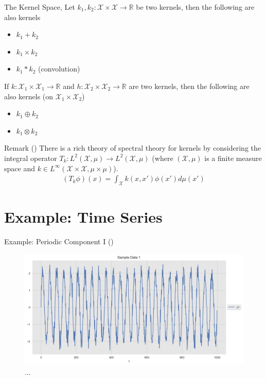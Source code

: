 \documentclass[10pt]{beamer}
\begin{document}
\begin{frame}{The Kernel Space}{\cite{ROERGA}, \cite[Chapter 4]{RW05}}
Let $k_1, k_2: \mathcal{X}\times\mathcal{X}\longrightarrow \mathbb{R}$ be two kernels, then the following are also kernels 
\begin{itemize}
\item $k_1 + k_2$ 
\item $k_1 \times k_2$
\item $k_1*k_2$ (convolution)
\end{itemize}
If $k: \mathcal{X}_1\times\mathcal{X}_1\longrightarrow \mathbb{R}$ and $h: \mathcal{X}_2\times\mathcal{X}_2\longrightarrow \mathbb{R}$ are two kernels, then the following are also kernels (on $\mathcal{X}_1 \times \mathcal{X}_2$)
\begin{itemize}
\item $k_1 \oplus k_2$ 
\item $k_1 \otimes k_2$
\end{itemize}
\begin{block}{Remark (\cite[Chapter 4.3]{RW05})}
There is a rich theory of spectral theory for kernels by considering the integral operator $T_k : L^2(\mathcal{X}, \mu) \longrightarrow L^2(\mathcal{X}, \mu)$ (where $(\mathcal{X}, \mu)$ is a finite measure space and $k\in L^{\infty}(\mathcal{X}\times \mathcal{X} , \mu\times\mu)$). 
\begin{align*}
(T_k\phi)(x) = \int_{\mathcal{X}} k(x, x')\phi(x') d\mu(x')
\end{align*}
\end{block}
\end{frame}

\section{Example: Time Series}

\begin{frame}{Example: Periodic Component I (\cite{gaussian_process_time_series_2019})}{\cite[Section 1.7. Gaussian Processes]{scikitlearn}}
\begin{center}
\begin{figure}
\includegraphics[scale=0.4]{images/gaussian_process_time_series_files/gaussian_process_time_series_13_0.png} 
\caption{ ...  }
\end{figure}
\end{center}
\end{frame}
\end{document}
